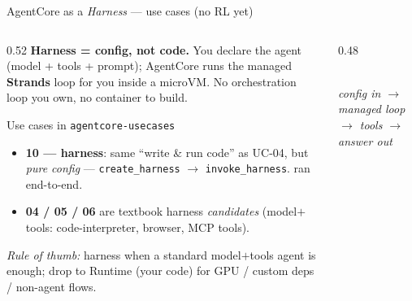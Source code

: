 \documentclass[aspectratio=169]{beamer}
\begin{document}
\begin{frame}{AgentCore as a \emph{Harness} --- use cases (no RL yet)}
  \begin{columns}[T]
    \begin{column}{0.52\textwidth}
      \footnotesize
      \textbf{Harness = config, not code.} You declare the agent (model + tools +
      prompt); AgentCore runs the managed \textbf{Strands} loop for you inside a
      microVM. No orchestration loop you own, no container to build.
      \vspace{0.3em}
      \begin{block}{Use cases in \texttt{agentcore-usecases}}
        \begin{itemize}\setlength\itemsep{0.15em}
          \item \textbf{10 --- harness}: same ``write \& run code'' as UC-04, but
            \emph{pure config} --- \texttt{create\_harness} $\to$ \texttt{invoke\_harness}.
             ran end-to-end.
          \item \textbf{04 / 05 / 06} are textbook harness \emph{candidates}
            (model$+$tools: code-interpreter, browser, MCP tools).
        \end{itemize}
      \end{block}
      \scriptsize\emph{Rule of thumb:} harness when a standard model$+$tools agent is
      enough; drop to Runtime (your code) for GPU / custom deps / non-agent flows.
    \end{column}
    \begin{column}{0.48\textwidth}
      \centering
      \\[0.2em]{\scriptsize\itshape config in $\to$ managed loop $\to$ tools $\to$ answer out}
    \end{column}
  \end{columns}
\end{frame}
\end{document}
